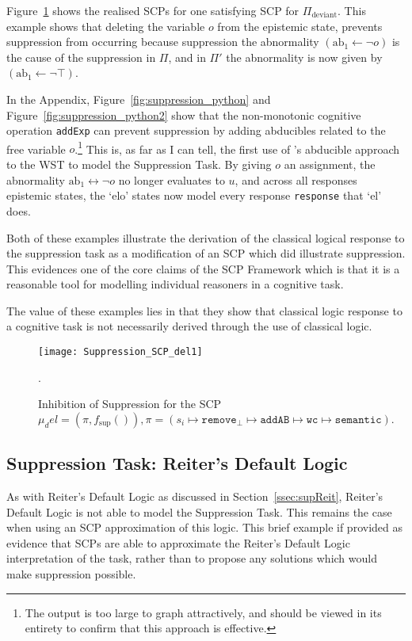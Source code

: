 Figure~\ref{fig:Suppression_SCP_del1} shows the realised SCPs for one satisfying SCP for $\Pi_\text{deviant}$. This example shows that deleting the variable $o$ from the epistemic state, prevents suppression from occurring because suppression the abnormality $(\text{ab}_1 \leftarrow \lnot o )$ is the cause of the suppression in $\Pi$, and in $\Pi'$ the abnormality is now given by $(\text{ab}_1 \leftarrow \lnot \top )$.

In the Appendix, Figure~\ref{fig:suppression_python} and Figure~\ref{fig:suppression_python2}  show that the non-monotonic cognitive operation \texttt{addExp} can prevent suppression by adding abducibles related to the  free variable $o$.\footnote{The output is too large to graph attractively, and should be viewed in its entirety to confirm that this approach is effective.} This is, as far as I can tell, the first use of \cite{holldobler2015weak}'s abducible approach to the WST to model the Suppression Task. By giving $o$ an assignment, the abnormality $\text{ab}_1\leftrightarrow \lnot o$ no longer evaluates to $u$, and across all responses epistemic states, the `elo' states now model every response \texttt{response} that `el' does.

Both of these examples illustrate the derivation of the classical logical response to the suppression task as a modification of an SCP which did illustrate suppression. This evidences one of the core claims of the SCP Framework which is that it is a reasonable tool for modelling individual reasoners in a cognitive task. 

The value of these examples lies in that they show that classical logic response to a cognitive task is not necessarily derived through the use of classical logic.

\begin{figure}
\centering \texttt{[image: Suppression\_SCP\_del1]}
\caption{Inhibition of Suppression for the SCP $\mu_del=(\pi,f_\text{sup}()), \pi = (s_i \longmapsto \texttt{remove}_\bot \longmapsto \texttt{addAB} \longmapsto \texttt{wc} \longmapsto \texttt{semantic}).$}.
\label{fig:Suppression_SCP_del1}
\end{figure}




\subsection{Suppression Task: Reiter's Default Logic}

As with  Reiter's Default Logic as discussed in Section~\ref{ssec:supReit}, Reiter's Default Logic is not able to model the Suppression Task. This remains the case when using an SCP approximation of this logic. This brief example if provided as evidence that SCPs are able to approximate the Reiter's Default Logic interpretation of the task, rather than to propose any solutions which would make suppression possible.

